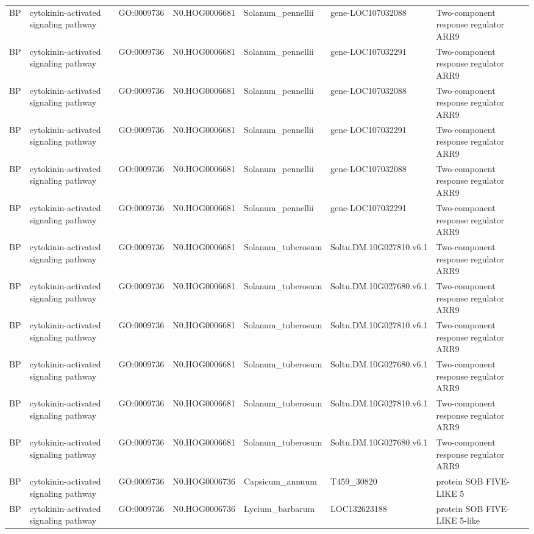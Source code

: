 \begin{table}
\begin{tabular}[t]{lllllll}
BP & cytokinin-activated signaling pathway & GO:0009736 & N0.HOG0006681 & Solanum\_pennellii & gene-LOC107032088 & Two-component response regulator ARR9\\
BP & cytokinin-activated signaling pathway & GO:0009736 & N0.HOG0006681 & Solanum\_pennellii & gene-LOC107032291 & Two-component response regulator ARR9\\
BP & cytokinin-activated signaling pathway & GO:0009736 & N0.HOG0006681 & Solanum\_pennellii & gene-LOC107032088 & Two-component response regulator ARR9\\
BP & cytokinin-activated signaling pathway & GO:0009736 & N0.HOG0006681 & Solanum\_pennellii & gene-LOC107032291 & Two-component response regulator ARR9\\
BP & cytokinin-activated signaling pathway & GO:0009736 & N0.HOG0006681 & Solanum\_pennellii & gene-LOC107032088 & Two-component response regulator ARR9\\
BP & cytokinin-activated signaling pathway & GO:0009736 & N0.HOG0006681 & Solanum\_pennellii & gene-LOC107032291 & Two-component response regulator ARR9\\
BP & cytokinin-activated signaling pathway & GO:0009736 & N0.HOG0006681 & Solanum\_tuberosum & Soltu.DM.10G027810.v6.1 & Two-component response regulator ARR9\\
BP & cytokinin-activated signaling pathway & GO:0009736 & N0.HOG0006681 & Solanum\_tuberosum & Soltu.DM.10G027680.v6.1 & Two-component response regulator ARR9\\
BP & cytokinin-activated signaling pathway & GO:0009736 & N0.HOG0006681 & Solanum\_tuberosum & Soltu.DM.10G027810.v6.1 & Two-component response regulator ARR9\\
BP & cytokinin-activated signaling pathway & GO:0009736 & N0.HOG0006681 & Solanum\_tuberosum & Soltu.DM.10G027680.v6.1 & Two-component response regulator ARR9\\
BP & cytokinin-activated signaling pathway & GO:0009736 & N0.HOG0006681 & Solanum\_tuberosum & Soltu.DM.10G027810.v6.1 & Two-component response regulator ARR9\\
BP & cytokinin-activated signaling pathway & GO:0009736 & N0.HOG0006681 & Solanum\_tuberosum & Soltu.DM.10G027680.v6.1 & Two-component response regulator ARR9\\
BP & cytokinin-activated signaling pathway & GO:0009736 & N0.HOG0006736 & Capsicum\_annuum & T459\_30820 & protein SOB FIVE-LIKE 5\\
BP & cytokinin-activated signaling pathway & GO:0009736 & N0.HOG0006736 & Lycium\_barbarum & LOC132623188 & protein SOB FIVE-LIKE 5-like\\

\end{tabular}
\end{table}
